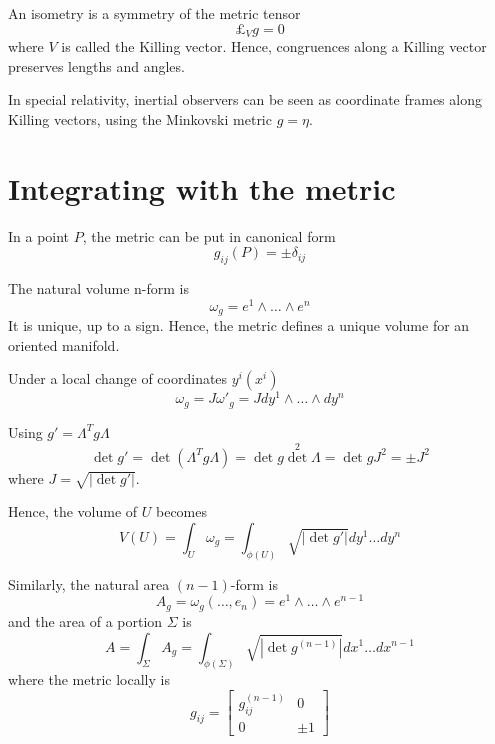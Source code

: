     An isometry is a symmetry of the metric tensor 
    \begin{equation}\label{kill}
        \pounds_V g = 0
    \end{equation}
    where $V$ is called the Killing vector. Hence, congruences along a Killing vector preserves lengths and angles.

    In special relativity, inertial observers can be seen as coordinate frames along Killing vectors, using the Minkovski metric $g = \eta$.

\section{Integrating with the metric}

    In a point $P$, the metric can be put in canonical form 
    \begin{equation*}
        g_{ij} (P) = \pm \delta_{ij}
    \end{equation*}

    The natural volume n-form is 
    \begin{equation*}
        \omega_g = e^1 \wedge \ldots \wedge e^n
    \end{equation*}
    It is unique, up to a sign. Hence, the metric defines a unique volume for an oriented manifold.
    
    Under a local change of coordinates $y^i(x^i)$ 
    \begin{equation*}
        \omega_g = J {\omega'}_g = J dy^1 \wedge \ldots \wedge dy^n
    \end{equation*}

    Using $g' = \Lambda^T g \Lambda$
    \begin{equation*}
        \det g' = \det (\Lambda^T g \Lambda) = \det g \det^2 \Lambda = \det g J^2 = \pm J^2
    \end{equation*}
    where $J = \sqrt{|\det g'|}$.

    Hence, the volume of $U$ becomes 
    \begin{equation*}
        V(U) = \int_U \omega_g = \int_{\phi(U)} \sqrt{|\det g'|} dy^1 \ldots dy^n
    \end{equation*}

    Similarly, the natural area $(n-1)$-form is 
    \begin{equation*}
        A_g = \omega_g (\ldots, e_n) = e^1 \wedge \ldots \wedge e^{n-1}
    \end{equation*}
    and the area of a portion $\Sigma$ is 
    \begin{equation*}
        A = \int_{\Sigma} A_g = \int_{\phi(\Sigma)} \sqrt{|\det g^{(n-1)}|} dx^1 \ldots dx^{n-1}
    \end{equation*}
    where the metric locally is 
    \begin{equation*}
        g_{ij} = \begin{bmatrix}
            g_{ij}^{(n-1)} & 0 \\
            0 & \pm 1
        \end{bmatrix}
    \end{equation*}
